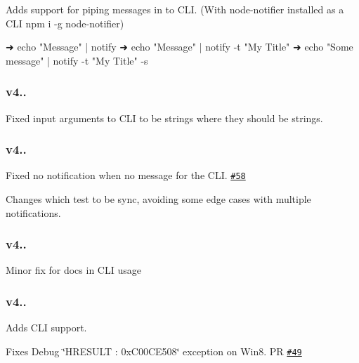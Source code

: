 \begin{DoxyEnumerate}
\item Adds support for piping messages in to C\+LI. (With {\ttfamily node-\/notifier} installed as a C\+LI {\ttfamily npm i -\/g node-\/notifier})
\end{DoxyEnumerate}


\begin{DoxyCode}
➜ echo "Message" | notify
➜ echo "Message" | notify -t "My Title"
➜ echo "Some message" | notify -t "My Title" -s
\end{DoxyCode}


\subsubsection*{{\ttfamily v4..}}


\begin{DoxyEnumerate}
\item Fixed input arguments to C\+LI to be strings where they should be strings.
\end{DoxyEnumerate}

\subsubsection*{{\ttfamily v4..}}


\begin{DoxyEnumerate}
\item Fixed no notification when no message for the C\+LI. \href{https://github.com/mikaelbr/node-notifier/pull/58}{\tt \#58}
\item Changes {\ttfamily which} test to be sync, avoiding some edge cases with multiple notifications.
\end{DoxyEnumerate}

\subsubsection*{{\ttfamily v4..}}


\begin{DoxyEnumerate}
\item Minor fix for docs in C\+LI usage
\end{DoxyEnumerate}

\subsubsection*{{\ttfamily v4..}}


\begin{DoxyEnumerate}
\item Adds C\+LI support.
\item Fixes Debug \char`\"{}\+H\+R\+E\+S\+U\+L\+T \+: 0x\+C00\+C\+E508\char`\"{} exception on Win8. PR \href{https://github.com/mikaelbr/node-notifier/pull/49}{\tt \#49}
\end{DoxyEnumerate}

